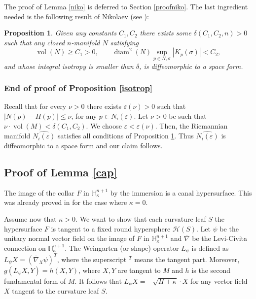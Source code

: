 \documentclass[10pt]{amsart}
\let\mathcal\mathscr
\DeclareMathOperator{\diam}{diam}
\DeclareMathOperator{\vol}{vol}
\let\epsilon\varepsilon
\newtheorem{proposition}[theorem]{Proposition}
\theoremstyle{definition}
\theoremstyle{remark}
\numberwithin{equation}{section}
\begin{document}
The proof of Lemma \ref{niko} is deferred to Section \ref{proofniko}. The last ingredient needed is the following result of Nikolaev
(see \cite{Nik}):
\begin{proposition}\label{Nikolaev}
Given
any constants $C_1,C_2$ there exists
some $\delta(C_1,C_2,n) >0$ such that
any closed $n$-manifold $N$ satisfying
\[
\vol(N) \geq C_1 >0,\qquad
\diam^2(N)\sup_{p\in N, \sigma}|K_p(\sigma)| < C_2,
\]
and whose integral isotropy is smaller than $\delta$,
is diffeomorphic to a space form.
\end{proposition}

\subsubsection*{End of proof of Proposition \ref{isotrop}}
Recall that for every $\nu>0$ there exists $\epsilon(\nu) >0$ such that
$|N(p)-H(p)| \leq \nu $, for any $p\in N_i(\varepsilon)$.
Let $\nu>0$ be such that $\nu \cdot \vol(M) < \delta(C_1,C_2)$. We choose $\varepsilon < \varepsilon(\nu)$.
Then, the Riemannian manifold $\widehat{N_i(\varepsilon)}$ satisfies all conditions of Proposition \ref{Nikolaev}.
Thus $\widehat{N_i(\varepsilon)}$ is diffeomorphic to a
space form and our claim follows.

\subsection{Proof of Lemma \ref{cap}}\label{proofcap}
The image of the collar $F$ in $\mathbb H_{\kappa}^{n+1}$ by the immersion is a canal hypersurface.
This was already proved in \cite{Pi,GM} for the case where $\kappa=0$.

Assume now that $\kappa >0$.
We want to show that each curvature leaf $S$ the hyper\-surface $F$ is tangent to a fixed
round hypersphere $\mathcal H(S)$.
Let $\psi$ be the unitary normal vector field on the image of
$F$ in $\mathbb H_{\kappa}^{n+1}$ and $\overline{\nabla}$ be the
Levi-Civita connection on $\mathbb H_{\kappa}^{n+1}$.
The Weingarten (or shape) operator $L_{\psi}$ is defined as
$L_{\psi}X=(\overline{\nabla}_X\psi)^{T}$, where the superscript $^T$ means
the tangent part. Moreover, $g(L_{\psi}X,Y)=h(X,Y)$, where $X,Y$ are tangent to $M$ and
$h$ is the second fundamental form of $M$. It follows that
$L_{\psi}X=-\sqrt{H+\kappa}\cdot X$
for any vector field $X$ tangent to the curvature leaf $S$.
\end{document}
